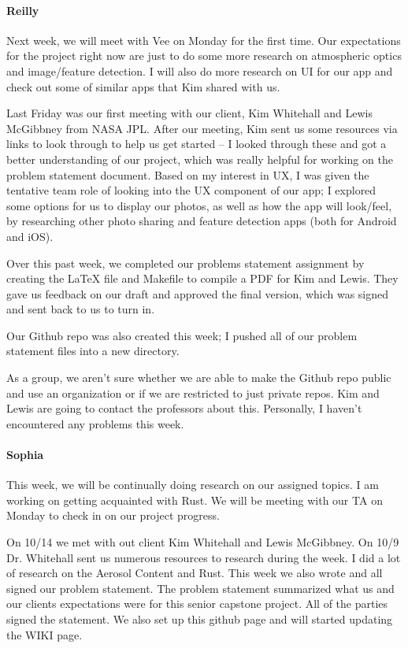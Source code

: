 \documentclass[onecolumn, draftclsnofoot,10pt, compsoc]{IEEEtran}
\begin{document}
\begin{flushleft}
\paragraph{Reilly}
 
Next week, we will meet with Vee on Monday for the first time. Our expectations for the project right now are just to do some more research on atmospheric optics and image/feature detection. I will also do more research on UI for our app and check out some of similar apps that Kim shared with us.
 
Last Friday was our first meeting with our client, Kim Whitehall and Lewis McGibbney from NASA JPL. After our meeting, Kim sent us some resources via links to look through to help us get started – I looked through these and got a better understanding of our project, which was really helpful for working on the problem statement document. Based on my interest in UX, I was given the tentative team role of looking into the UX component of our app; I explored some options for us to display our photos, as well as how the app will look/feel, by researching other photo sharing and feature detection apps (both for Android and iOS).
 
Over this past week, we completed our problems statement assignment by creating the LaTeX file and Makefile to compile a PDF for Kim and Lewis. They gave us feedback on our draft and approved the final version, which was signed and sent back to us to turn in.
 
Our Github repo was also created this week; I pushed all of our problem statement files into a new directory.
 
 
As a group, we aren't sure whether we are able to make the Github repo public and use an organization or if we are restricted to just private repos. Kim and Lewis are going to contact the professors about this. Personally, I haven't encountered any problems this week.
 
\paragraph{Sophia}
 
This week, we will be continually doing research on our assigned topics. I am working on getting acquainted with Rust. We will be meeting with our TA on Monday to check in on our project progress.
 
 
On 10/14 we met with out client Kim Whitehall and Lewis McGibbney. On 10/9 Dr. Whitehall sent us numerous resources to research during the week. I did a lot of research on the Aerosol Content and Rust. This week we also wrote and all signed our problem statement. The problem statement summarized what us and our clients expectations were for this senior capstone project. All of the parties signed the statement. We also set up this github page and will started updating the WIKI page.
 

\end{flushleft}
\end{document}
